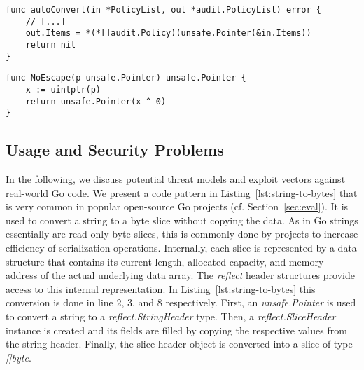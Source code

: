\begin{lstlisting}[language=Golang, label=lst:unsafe-ex-in-place-cast, caption=In-place cast using the \unsafe{} package
from the Kubernetes \textit{k8s.io/apiserver} module with minor changes.
,float, belowskip=-1.5em]
func autoConvert(in *PolicyList, out *audit.PolicyList) error {
	// [...]
	out.Items = *(*[]audit.Policy)(unsafe.Pointer(&in.Items))
	return nil
}
\end{lstlisting}

\begin{lstlisting}[language=Golang, label=lst:unsafe-ex-escape-analysis, caption=Hiding a value from escape analysis from the \textit{modern-go/reflect2} module.
, float, belowskip=-1.5em]
func NoEscape(p unsafe.Pointer) unsafe.Pointer {
	x := uintptr(p)
	return unsafe.Pointer(x ^ 0)
}
\end{lstlisting}







\subsection{Usage and Security Problems}
\label{sec:appr:vulnerabilites}

In the following, we discuss potential threat models and exploit vectors against real-world \unsafe{} Go code.
We present a code pattern in Listing~\ref{lst:string-to-bytes} that is very common in popular open-source Go projects (cf. Section~\ref{sec:eval}).
It is used to convert a string to a byte slice without copying the data.
As in Go strings essentially are read-only byte slices, this is commonly done by projects to increase efficiency of serialization operations. %
Internally, each slice is represented by a data structure that contains its current length, allocated capacity, and memory address of the actual underlying data array.
The \textit{reflect} header structures provide access to this internal representation.
In Listing~\ref{lst:string-to-bytes} this conversion is done in line 2, 3, and 8 respectively.
First, an \textit{unsafe.Pointer} is used to convert a string to a \textit{reflect.StringHeader} type.
Then, a \textit{reflect.SliceHeader} instance is created and its fields are filled by copying the respective values from the string header.
Finally, the slice header object is converted into a slice of type \textit{[]byte}.

